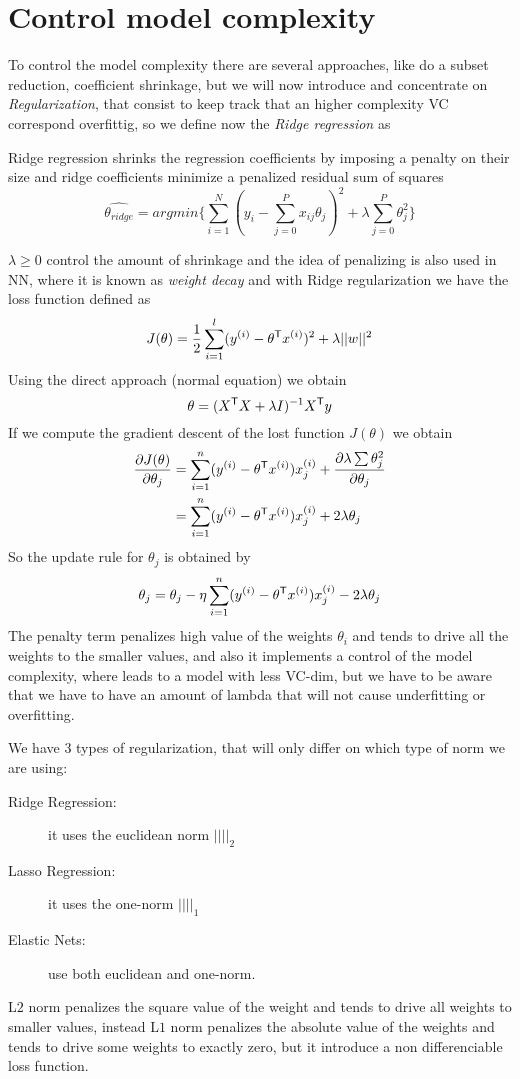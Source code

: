 \section{Control model complexity}
To control the model complexity there are several approaches, like do a subset reduction, coefficient shrinkage, but we will now introduce and 
concentrate on \emph{Regularization}, that consist to keep track that an higher complexity VC correspond overfittig, so we define now the \emph{Ridge regression} as 
\begin{defi}
	Ridge regression shrinks the regression coefficients by imposing a penalty on their size and ridge coefficients minimize a penalized residual sum of squares
	\[ \hat{\theta_{ridge}} = argmin \{ \sum _{i=1}^N (y_i - \sum _{j=0}^P x_{ij} \theta_j)^2 + \lambda \sum _{j=0}^P \theta_j^2 \} \]
\end{defi}
$\lambda \geq 0$ control the amount of shrinkage and the idea of penalizing is also used in NN, where it is known as \emph{weight decay} and with Ridge regularization 
we have the loss function defined as 
\[ J(\theta) = \frac{1}{2} \sum _{i=1}^l (y^{(i)} - \theta ^ \mathsf{T}x^{(i)})^2 + \lambda ||w||^2 \]
Using the direct approach (normal equation) we obtain 
\[ \theta = (X ^ \mathsf{T}X + \lambda I)^{-1} X ^ \mathsf{T} y \]
If we compute the gradient descent of the lost function $J(\theta)$ we obtain 
\begin{align*}
	\frac{\partial J(\theta)}{\partial \theta_j} & = \sum _{i=1}^n (y^{(i)} - \theta ^ \mathsf{T}x^{(i)}) x^{(i)}_j + \frac{\partial \lambda \sum \theta_j^2}{\partial \theta_j} \\
	                              & = \sum _{i=1}^n (y^{(i)} - \theta ^ \mathsf{T}x^{(i)}) x^{(i)}_j + 2 \lambda \theta_j \\
\end{align*} 
So the update rule for $\theta_j$ is obtained by 
\[ \theta_j = \theta_j - \eta \sum _{i=1}^n (y^{(i)} - \theta ^ \mathsf{T}x^{(i)}) x^{(i)}_j - 2 \lambda \theta_j \]
The penalty term penalizes high value of the weights $\theta_i$ and tends to drive all the weights to the smaller values, and also it implements a control of the model complexity, where
leads to a model with less VC-dim, but we have to be aware that we have to have an amount of lambda that will not cause underfitting or overfitting.

We have $3$ types of regularization, that will only differ on which type of norm we are using:
\begin{description}
	\item [Ridge Regression: ] it uses the euclidean norm $|| ||_2$
	\item [Lasso Regression: ] it uses the one-norm $|| ||_1$
	\item [Elastic Nets:] use both euclidean and one-norm.
\end{description}
L$2$ norm penalizes the square value of the weight and tends to drive all weights to smaller values, instead L$1$ norm penalizes the absolute value of the weights and tends to drive some 
weights to exactly zero, but it introduce a non differenciable loss function.

